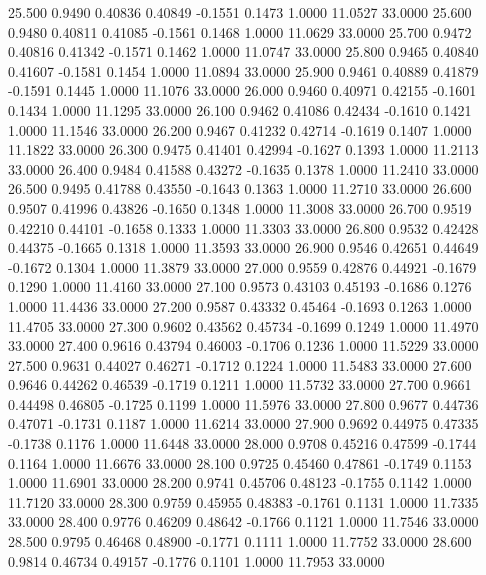   25.500   0.9490   0.40836   0.40849  -0.1551   0.1473   1.0000  11.0527  33.0000
  25.600   0.9480   0.40811   0.41085  -0.1561   0.1468   1.0000  11.0629  33.0000
  25.700   0.9472   0.40816   0.41342  -0.1571   0.1462   1.0000  11.0747  33.0000
  25.800   0.9465   0.40840   0.41607  -0.1581   0.1454   1.0000  11.0894  33.0000
  25.900   0.9461   0.40889   0.41879  -0.1591   0.1445   1.0000  11.1076  33.0000
  26.000   0.9460   0.40971   0.42155  -0.1601   0.1434   1.0000  11.1295  33.0000
  26.100   0.9462   0.41086   0.42434  -0.1610   0.1421   1.0000  11.1546  33.0000
  26.200   0.9467   0.41232   0.42714  -0.1619   0.1407   1.0000  11.1822  33.0000
  26.300   0.9475   0.41401   0.42994  -0.1627   0.1393   1.0000  11.2113  33.0000
  26.400   0.9484   0.41588   0.43272  -0.1635   0.1378   1.0000  11.2410  33.0000
  26.500   0.9495   0.41788   0.43550  -0.1643   0.1363   1.0000  11.2710  33.0000
  26.600   0.9507   0.41996   0.43826  -0.1650   0.1348   1.0000  11.3008  33.0000
  26.700   0.9519   0.42210   0.44101  -0.1658   0.1333   1.0000  11.3303  33.0000
  26.800   0.9532   0.42428   0.44375  -0.1665   0.1318   1.0000  11.3593  33.0000
  26.900   0.9546   0.42651   0.44649  -0.1672   0.1304   1.0000  11.3879  33.0000
  27.000   0.9559   0.42876   0.44921  -0.1679   0.1290   1.0000  11.4160  33.0000
  27.100   0.9573   0.43103   0.45193  -0.1686   0.1276   1.0000  11.4436  33.0000
  27.200   0.9587   0.43332   0.45464  -0.1693   0.1263   1.0000  11.4705  33.0000
  27.300   0.9602   0.43562   0.45734  -0.1699   0.1249   1.0000  11.4970  33.0000
  27.400   0.9616   0.43794   0.46003  -0.1706   0.1236   1.0000  11.5229  33.0000
  27.500   0.9631   0.44027   0.46271  -0.1712   0.1224   1.0000  11.5483  33.0000
  27.600   0.9646   0.44262   0.46539  -0.1719   0.1211   1.0000  11.5732  33.0000
  27.700   0.9661   0.44498   0.46805  -0.1725   0.1199   1.0000  11.5976  33.0000
  27.800   0.9677   0.44736   0.47071  -0.1731   0.1187   1.0000  11.6214  33.0000
  27.900   0.9692   0.44975   0.47335  -0.1738   0.1176   1.0000  11.6448  33.0000
  28.000   0.9708   0.45216   0.47599  -0.1744   0.1164   1.0000  11.6676  33.0000
  28.100   0.9725   0.45460   0.47861  -0.1749   0.1153   1.0000  11.6901  33.0000
  28.200   0.9741   0.45706   0.48123  -0.1755   0.1142   1.0000  11.7120  33.0000
  28.300   0.9759   0.45955   0.48383  -0.1761   0.1131   1.0000  11.7335  33.0000
  28.400   0.9776   0.46209   0.48642  -0.1766   0.1121   1.0000  11.7546  33.0000
  28.500   0.9795   0.46468   0.48900  -0.1771   0.1111   1.0000  11.7752  33.0000
  28.600   0.9814   0.46734   0.49157  -0.1776   0.1101   1.0000  11.7953  33.0000

